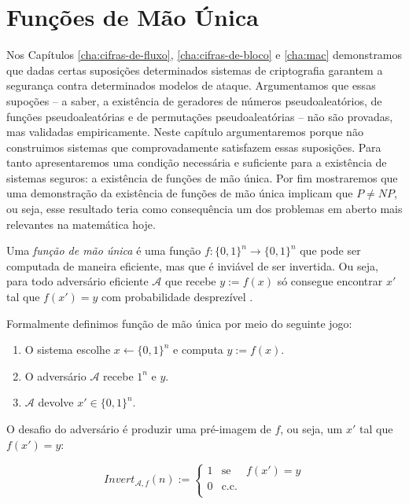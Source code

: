 \chapter{Funções de Mão Única}
\label{cha:owf}

Nos Capítulos \ref{cha:cifras-de-fluxo}, \ref{cha:cifras-de-bloco} e \ref{cha:mac} demonstramos que dadas certas suposições determinados sistemas de criptografia garantem a segurança contra determinados modelos de ataque.
Argumentamos que essas supoções -- a saber, a existência de geradores de números pseudoaleatórios, de funções pseudoaleatórias e de permutações pseudoaleatórias -- não são provadas, mas validadas empiricamente.
Neste capítulo argumentaremos porque não construimos sistemas que comprovadamente satisfazem essas suposições.
Para tanto apresentaremos uma condição necessária e suficiente para a existência de sistemas seguros: a existência de funções de mão única.
Por fim mostraremos que uma demonstração da existência de funções de mão única implicam que $P \neq NP$, ou seja, esse resultado teria como consequência um dos problemas em aberto mais relevantes na matemática hoje.

Uma {\em função de mão única} é uma função $f: \{0,1\}^n \to \{0,1\}^n$ que pode ser computada de maneira eficiente, mas que é inviável de ser invertida.
Ou seja, para todo adversário eficiente $\mathcal{A}$ que recebe $y := f(x)$ só consegue encontrar $x'$ tal que $f(x') = y$ com probabilidade desprezível \cite{Diffie76,Yao82}.

Formalmente definimos função de mão única por meio do seguinte jogo:
\begin{enumerate}
\item O sistema escolhe $x \leftarrow \{0,1\}^n$ e computa $y := f(x)$.
\item O adversário $\mathcal{A}$ recebe $1^n$ e $y$.
\item $\mathcal{A}$ devolve $x' \in \{0,1\}^n$.
\end{enumerate}

O desafio do adversário é produzir uma pré-imagem de $f$, ou seja, um $x'$ tal que $f(x') = y$:

\begin{displaymath}
  Invert_{\mathcal{A}, f}(n) := \left\{
    \begin{array}{lcl}
      1 & \textrm{se} & f(x') = y\\
      0 & \textrm{c.c.} &\\
    \end{array}
    \right.
\end{displaymath}

